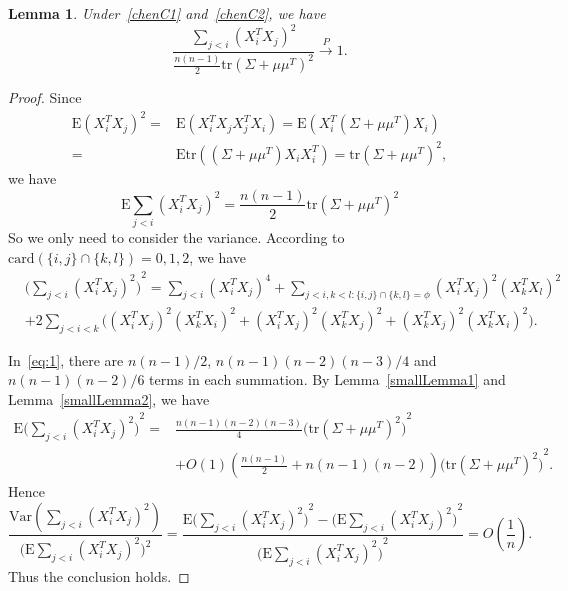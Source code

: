 \documentclass[review]{elsarticle}
\theoremstyle{plain}
\newtheorem{lemma}{Lemma}
\theoremstyle{definition}
\theoremstyle{remark}
\begin{document}
\begin{lemma}\label{ratioLemma}
    Under~\eqref{chenC1} and~\eqref{chenC2}, we have
        $$
        \frac{\sum_{j<i}{(X_i^T X_j)}^2}{\frac{n(n-1)}{2}\mathrm{tr} (\Sigma+\mu\mu^T)^2}
        \xrightarrow{P}1.
        $$
\end{lemma}
\begin{proof}
    Since
        $$
        \begin{aligned}
            \mathrm{E}{(X_i^T X_j)}^2=&
            \mathrm{E}(X_i^T X_j X_j^T X_i)=
            \mathrm{E}(X_i^T (\Sigma+\mu \mu^T) X_i)\\
            =&
            \mathrm{E}\mathrm{tr}((\Sigma+\mu \mu^T) X_i X_i^T)=\mathrm{tr}{(\Sigma+\mu \mu^T)}^2,
        \end{aligned}
    $$
   we have 
        $$
        \mathrm{E}\sum_{j<i}{(X_i^T X_j)}^2=\frac{n(n-1)}{2}\mathrm{tr}{(\Sigma+\mu\mu^T)}^2
    $$
    So we only need to consider the variance. According to $\mathrm{card}(\{i,j\}\cap\{k,l\})=0,1,2$, we have
    \begin{equation}\label{eq:1}
    \begin{aligned}
        &{\big(\sum_{j<i}{(X_i^T X_j)}^2\big)}^2
        =
        \sum_{j<i}{(X_i^T X_j)}^4+
        \sum_{j<i,k<l:\{i,j\}\cap \{k,l\}=\phi}{(X_i^T X_j)}^2{(X_k^T X_l)}^2\\
        &+2\sum_{j<i<k}\big(
        {(X_i^T X_j)}^2{(X_k^T X_i)}^2+
{(X_i^T X_j)}^2{(X_k^T X_j)}^2+
{(X_k^T X_j)}^2{(X_k^T X_i)}^2
        \big).
    \end{aligned}
    \end{equation}


   
    In~\eqref{eq:1}, there are $n(n-1)/2$, $n(n-1)(n-2)(n-3)/4$ and $n(n-1)(n-2)/6$ terms in each summation. By Lemma~\ref{smallLemma1} and Lemma~\ref{smallLemma2}, we have
    $$
    \begin{aligned}
        \mathrm{E}{\big(\sum_{j<i}{(X_i^T X_j)}^2\big)}^2
            =&\frac{n(n-1)(n-2)(n-3)}{4}{\big(\mathrm{tr}(\Sigma+\mu\mu^T)^2\big)}^2\\
            &+O(1)(\frac{n(n-1)}{2}+n(n-1)(n-2)){\big(\mathrm{tr}(\Sigma+\mu\mu^T)^2\big)}^2.
    \end{aligned}
    $$
Hence 
    $$
    \frac{
        \mathrm{Var}(\sum_{j<i}{(X_i^T X_j)}^2)
    }{\big(\mathrm{E}\sum_{j<i}{(X_i^T X_j)}^2\big)^2}
    =
    \frac{
        \mathrm{E}{\big(\sum_{j<i}{(X_i^T X_j)}^2\big)}^2-
        {\big(\mathrm{E}\sum_{j<i}{(X_i^T X_j)}^2\big)}^2
    }{
        {\big(\mathrm{E}\sum_{j<i}{(X_i^T X_j)}^2\big)}^2
    }
    =O(\frac{1}{n}).
    $$
    Thus the conclusion holds.
\end{proof}
\end{document}
